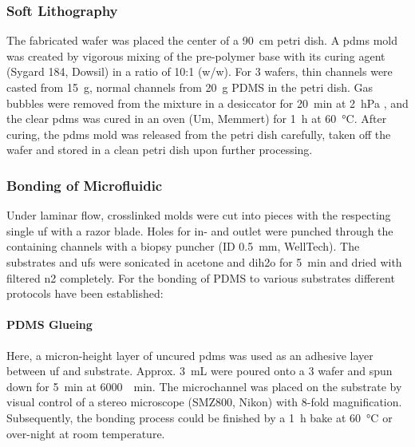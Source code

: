 \subsubsection{Soft Lithography}
The fabricated wafer was placed the center of a \SI{90}{\centi\meter} petri dish. A \gls{pdms} mold was created by vigorous mixing of the pre-polymer base with its curing agent (Sygard 184, Dowsil) in a ratio of 10:1 (w/w). For \SI{3}{\inch} wafers, thin channels were casted from \SI{15}{\gram}, normal channels from \SI{20}{\gram} PDMS in the petri dish. Gas bubbles were removed from the mixture in a desiccator for \SI{20}{\minute} at \SI{2}{\hecto\pascal} , and the clear \gls{pdms} was cured in an oven (Um, Memmert) for \SI{1}{\hour} at \SI{60}{\degreeCelsius}. After curing, the \gls{pdms} mold was released from the petri dish carefully, taken off the wafer and stored in a clean petri dish upon further processing.  

\subsubsection{Bonding of Microfluidic}
Under laminar flow, crosslinked molds were cut into pieces with the respecting single \gls{uf} with a razor blade. Holes for in- and outlet were punched through the containing channels with a biopsy puncher (ID \SI{0.5}{\milli\meter}, WellTech). The substrates and \glspl{uf} were sonicated in acetone and \gls{dih2o} for \SI{5}{\minute} and dried with filtered \gls{n2} completely. For the bonding of PDMS to various substrates different protocols have been established:

\paragraph{PDMS Glueing}
\label{sec:meth:bond:glue}
Here, a micron-height layer of uncured \gls{pdms} was used as an adhesive layer between \gls{uf} and substrate. Approx. \SI{3}{\milli\liter} were poured onto a \SI{3}{\inch} wafer and spun down for \SI{5}{\minute} at \SI{6000}{\per\minute}. The microchannel was placed on the substrate by visual control of a stereo microscope (SMZ800, Nikon) with 8-fold magnification. Subsequently, the bonding process could be finished by a \SI{1}{\hour} bake at \SI{60}{\degreeCelsius} or over-night at room temperature.
